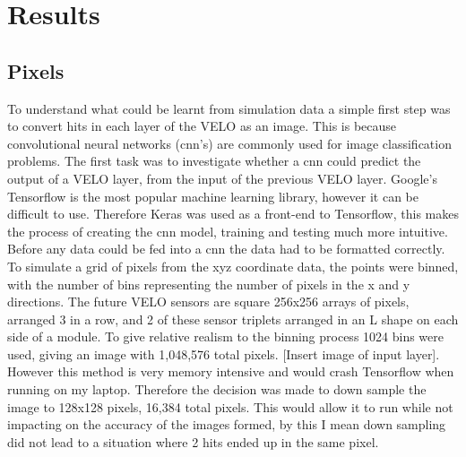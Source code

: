 \chapter{Results}


\graphicspath{{Figs/}}


\section{Pixels} %
To understand what could be learnt from simulation data a simple first step was to convert hits in each layer of the VELO as an image. This is because convolutional neural networks (cnn's) are commonly used for image classification problems. The first task was to investigate whether a cnn could predict the output of a VELO layer, from the input of the previous VELO layer. Google's Tensorflow is the most popular machine learning library, however it can be difficult to use. Therefore Keras was used as a front-end to Tensorflow, this makes the process of creating the cnn model, training and testing much more intuitive. Before any data could be fed into a cnn the data had to be formatted correctly. To simulate a grid of pixels from the xyz coordinate data, the points were binned, with the number of bins representing the number of pixels in the x and y directions. The future VELO sensors are square 256x256 arrays of pixels, arranged 3 in a row, and 2 of these sensor triplets arranged in an L shape on each side of a module. To give relative realism to the binning process 1024 bins were used, giving an image with 1,048,576 total pixels. [Insert image of input layer]. However this method is very memory intensive and would crash Tensorflow when running on my laptop. Therefore the decision was made to down sample the image to 128x128 pixels, 16,384 total pixels. This would allow it to run while not impacting on the accuracy of the images formed, by this I mean down sampling did not lead to a situation where 2 hits ended up in the same pixel. 

